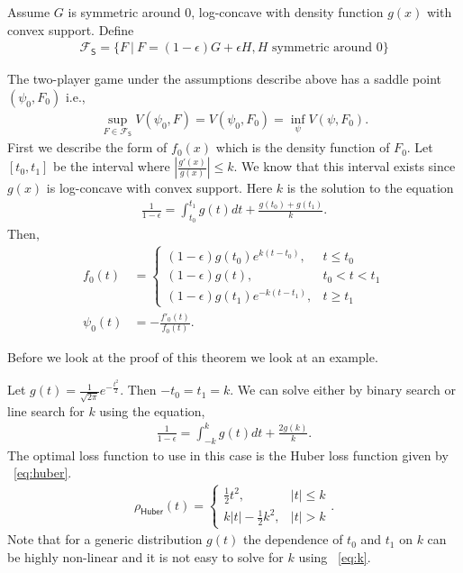\documentclass{article}
\newcommand{\abs}[1]{\ensuremath{\left|#1\right|}}
\begin{document}
\begin{theorem}
Assume $G$ is symmetric around 0, log-concave with density function $g(x)$ with convex support. Define
\begin{align}
    \mathcal{F}_{\mathsf{S}} = \{F \ | \ F= (1-\epsilon) G + \epsilon H, H \text{ symmetric around }0 \}
\end{align}

The two-player game under the assumptions describe above has a saddle point $(\psi_0, F_0)$ i.e.,
\begin{align*}
    \sup\limits_{F\in \mathcal{F}_{\mathsf{S}}} V(\psi_0, F) = V(\psi_0, F_0) = \inf\limits_{\psi} V(\psi, F_0). 
\end{align*}
First we describe the form of $f_0(x)$ which is the density function of $F_0$. Let $[t_0, t_1]$ be the interval where $\abs{\frac{g'(x)}{g(x)}} \leq k$. We know that this interval exists since $g(x)$ is log-concave with convex support. Here $k$ is the solution to the equation 
\begin{align}
    \frac{1}{1-\epsilon} = \int_{t_0}^{t_1} g(t) dt + \frac{g(t_0) + g(t_1)}{k}.\label{eq:k}
\end{align}
Then,
\begin{align}
    f_0(t) &= \begin{cases} (1-\epsilon) g(t_0) e^{k(t- t_0)}, & t \leq t_0 \\ 
    (1-\epsilon) g(t), & t_0 < t < t_1\\
    (1- \epsilon) g(t_1) e^{-k(t- t_1)}, & t \geq t_1
    \end{cases}\label{eq:f0t}\\
    \psi_0(t) &= -\frac{f'_0(t)}{f_0(t)}.
\end{align}

\label{huber}

\end{theorem}
Before we look at the proof of this theorem we look at an example.\\
\begin{example}
Let $g(t) = \frac{1}{\sqrt{2\pi}} e^{-\frac{t^2}{2}}$.  Then $-t_0= t_1 = k$. We can solve either by binary search or line search for $k$ using the equation,
\begin{align*}
    \frac{1}{1- \epsilon} = \int_{-k}^k g(t) dt + \frac{2g(k)}{k}.
\end{align*}
The optimal loss function to use in this case is the Huber loss function given by ~\eqref{eq:huber}.
\begin{align*}
     \rho_{\mathsf{Huber}}(t) = \begin{cases} \frac{1}{2} t^2, & \abs{t} \leq k \\ k \abs{t} - \frac{1}{2}k^2, & \abs{t} > k \end{cases}. 
\end{align*}
Note that for a generic distribution $g(t)$ the dependence of $t_0 $ and $t_1$ on $k$ can be highly non-linear and it is not easy to solve for $k$ using ~\eqref{eq:k}.
\end{example}\\
\end{document}
